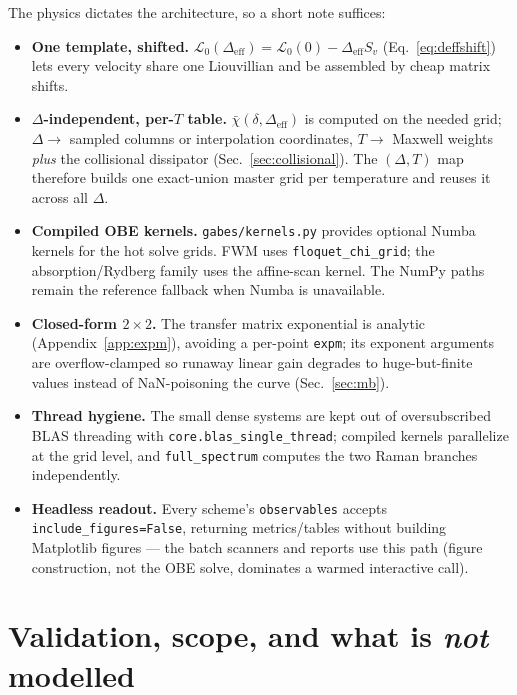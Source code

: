 \documentclass[11pt]{article}
\newcommand{\eff}{\mathrm{eff}}
\newcommand{\code}[1]{\texttt{#1}}
\newcommand{\Lcal}{\mathcal{L}}
\newcommand{\rhobar}{\bar{\chi}}
\begin{document}
The physics dictates the architecture, so a short note suffices:
\begin{itemize}[leftmargin=1.6em]
  \item \textbf{One template, shifted.} $\Lcal_0(\Delta_\eff)=\Lcal_0(0)-\Delta_\eff
  S_v$ (Eq.~\eqref{eq:deffshift}) lets every velocity share one Liouvillian and be
  assembled by cheap matrix shifts.
  \item \textbf{$\Delta$-independent, per-$T$ table.} $\rhobar(\delta,\Delta_\eff)$
  is computed on the needed grid; $\Delta\to$ sampled columns or interpolation
  coordinates, $T\to$ Maxwell weights \emph{plus} the collisional dissipator
  (Sec.~\ref{sec:collisional}). The $(\Delta,T)$ map therefore builds one
  exact-union master grid per temperature and reuses it across all $\Delta$.
  \item \textbf{Compiled OBE kernels.} \code{gabes/kernels.py} provides optional
  Numba kernels for the hot solve grids. FWM uses
  \code{floquet\_chi\_grid}; the absorption/Rydberg family uses the affine-scan
  kernel. The NumPy paths remain the reference fallback when Numba is unavailable.
  \item \textbf{Closed-form $2\times2$.} The transfer matrix exponential is
  analytic (Appendix~\ref{app:expm}), avoiding a per-point \code{expm}; its
  exponent arguments are overflow-clamped so runaway linear gain degrades to
  huge-but-finite values instead of NaN-poisoning the curve (Sec.~\ref{sec:mb}).
  \item \textbf{Thread hygiene.} The small dense systems are kept out of
  oversubscribed BLAS threading with \code{core.blas\_single\_thread}; compiled
  kernels parallelize at the grid level, and \code{full\_spectrum} computes the
  two Raman branches independently.
  \item \textbf{Headless readout.} Every scheme's \code{observables} accepts
  \code{include\_figures=False}, returning metrics/tables without building
  Matplotlib figures --- the batch scanners and reports use this path (figure
  construction, not the OBE solve, dominates a warmed interactive call).
\end{itemize}

\section{Validation, scope, and what is \emph{not} modelled}
\end{document}
